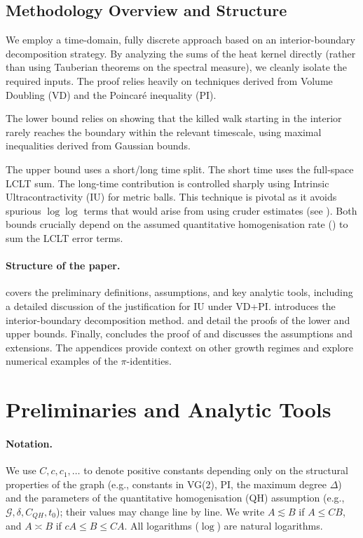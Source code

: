 \documentclass{article}
\numberwithin{equation}{section}
\theoremstyle{definition}
\theoremstyle{remark}
\newcommand{\cG}{\mathcal{G}}
\begin{document}
\subsection{Methodology Overview and Structure}
We employ a time-domain, fully discrete approach based on an interior-boundary decomposition strategy. By analyzing the sums of the heat kernel directly (rather than using Tauberian theorems on the spectral measure), we cleanly isolate the required inputs. The proof relies heavily on techniques derived from Volume Doubling (VD) and the Poincaré inequality (PI).

The lower bound relies on showing that the killed walk starting in the interior rarely reaches the boundary within the relevant timescale, using maximal inequalities derived from Gaussian bounds.

The upper bound uses a short/long time split. The short time uses the full-space LCLT sum. The long-time contribution is controlled sharply using Intrinsic Ultracontractivity (IU) for metric balls. This technique is pivotal as it avoids spurious $\log\log$ terms that would arise from using cruder estimates (see ). Both bounds crucially depend on the assumed quantitative homogenisation rate () to sum the LCLT error terms.

\paragraph{Structure of the paper.}
 covers the preliminary definitions, assumptions, and key analytic tools, including a detailed discussion of the justification for IU under VD+PI.  introduces the interior-boundary decomposition method.  and  detail the proofs of the lower and upper bounds. Finally,  concludes the proof of  and discusses the assumptions and extensions. The appendices provide context on other growth regimes and explore numerical examples of the $\pi$-identities.


\section{Preliminaries and Analytic Tools}\label{sec:prelim}

\paragraph{Notation.} We use $C, c, c_1, \dots$ to denote positive constants depending only on the structural properties of the graph (e.g., constants in VG(2), PI, the maximum degree $\Delta$) and the parameters of the quantitative homogenisation (QH) assumption (e.g., $\cG, \delta, C_{QH}, t_0$); their values may change line by line. We write $A \lesssim B$ if $A \leq C B$, and $A \asymp B$ if $c A \leq B \leq C A$. All logarithms ($\log$) are natural logarithms.
\end{document}
